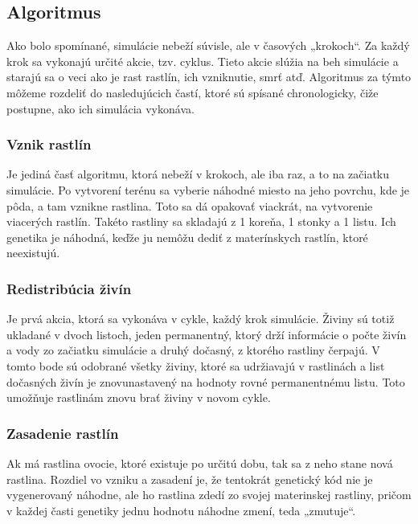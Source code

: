 \documentclass[12pt]{article}
\begin{document}
\subsection{Algoritmus}

Ako bolo spomínané, simulácie nebeží súvisle, ale v časových „krokoch“.
Za každý krok sa vykonajú určité akcie, tzv. cyklus. Tieto akcie slúžia na beh
simulácie a starajú sa o veci ako je rast rastlín, ich vzniknutie, smrť atď.
Algoritmus za týmto môžeme rozdeliť do nasledujúcich častí, ktoré sú spísané
chronologicky, čiže postupne, ako ich simulácia vykonáva.

\subsubsection{Vznik rastlín}

Je jediná časť algoritmu, ktorá nebeží v krokoch, ale iba raz, a to na začiatku
simulácie. Po vytvorení terénu sa vyberie náhodné miesto na jeho povrchu, kde
je pôda, a tam vznikne rastlina. Toto sa dá opakovať viackrát, na vytvorenie
viacerých rastlín. Takéto rastliny sa skladajú z 1 koreňa, 1 stonky a 1 listu.
Ich genetika je náhodná, keďže ju nemôžu dediť z materínskych rastlín, ktoré
neexistujú.

\subsubsection{Redistribúcia živín}

Je prvá akcia, ktorá sa vykonáva v cykle, každý krok simulácie. Živiny sú totiž
ukladané v dvoch listoch, jeden permanentný, ktorý drží informácie o počte
živín a vody zo začiatku simulácie a druhý dočasný, z ktorého rastliny čerpajú.
V tomto bode sú odobrané všetky živiny, ktoré sa udržiavajú v rastlinách a list
dočasných živín je znovunastavený na hodnoty rovné permanentnému listu.
Toto umožňuje rastlinám znovu brať živiny v novom cykle.

\subsubsection{Zasadenie rastlín}

Ak má rastlina ovocie, ktoré existuje po určitú dobu, tak sa z neho stane nová
rastlina. Rozdiel vo vzniku a zasadení je, že tentokrát genetický kód nie je
vygenerovaný náhodne, ale ho rastlina zdedí zo svojej materinskej rastliny,
pričom v každej časti genetiky jednu hodnotu náhodne zmení, teda „zmutuje“.
\end{document}
